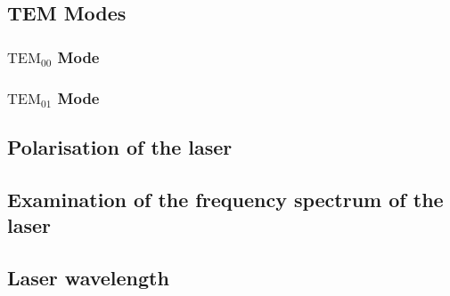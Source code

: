 \subsection{TEM Modes}
\subsubsection{\texorpdfstring{$\text{TEM}_{00}$}{TEM} Mode}
\subsubsection{\texorpdfstring{$\text{TEM}_{01}$}{TEM} Mode}
\subsection{Polarisation of the laser}
\subsection{Examination of the frequency spectrum of the laser}
\subsection{Laser wavelength}
